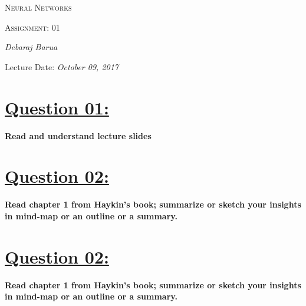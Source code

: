 \documentclass[10pt,a4paper]{article}
\begin{document}
\begin{titlepage}
\centering

	{\scshape\LARGE Neural Networks\par}
	
	{\scshape\Large Assignment: 01\par}

	\vfill
	
	\vfill
	{\Large\itshape Debaraj Barua\par}
	\vfill
		
	{\large Lecture Date: \textit{October 09, 2017}  \par}
\end{titlepage}
\tableofcontents

\newpage
\section*{\underline{Question 01:}}
\textbf{Read and understand lecture slides}

\section*{\underline{Question 02:}}
\textbf{Read chapter 1 from Haykin’s book; summarize or sketch your insights in mind-map or an outline or a summary.}

\section*{\underline{Question 02:}}
\textbf{Read chapter 1 from Haykin’s book; summarize or sketch your insights in mind-map or an outline or a summary.}
 

\newpage



\end{document}
